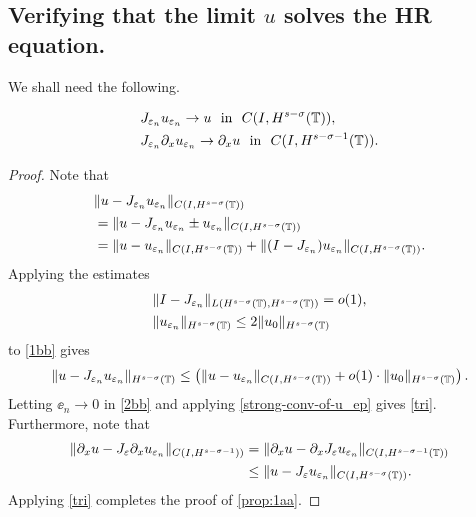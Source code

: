 \subsection{Verifying that the limit $u$ solves the HR equation.} 
We shall need the following. 
\begin{proposition}
\label{prop:1aa}
\begin{align}
    \label{tri}
& J_{\varepsilon_n} u_{\varepsilon_n} \to  u \ \ \text{in} \ \
C(I, H^{s-\sigma}(\mathbb{T})),
\\
\label{0dd}
& J_{\varepsilon_n} \partial_x u_{\varepsilon_n} \to  \partial_x u \ \
\text{in} \ \ C(I, H^{s-\sigma-1}(\mathbb{T})).
\end{align}
\end{proposition}
\begin{proof} Note that
\begin{equation}
\begin{split}
& \| u -  J_{\varepsilon_n} u_{\varepsilon_n}
\|_{C(I, H^{s-\sigma}(\mathbb{T}))}
\\
&= \| u -  J_{\varepsilon_n} u_{\varepsilon_n} \pm 
u_{\varepsilon_n} \|_{C(I, H^{s-\sigma}(\mathbb{T}))}
\\
& = \| u -  u_{\varepsilon_n}
\|_{C(I,H^{s-\sigma}(\mathbb{T}))} + \| (I - J_{\varepsilon_n})
u_{\varepsilon_n} \|_{C(I, H^{s-\sigma}(\mathbb{T}))}.
\label{1bb}
\end{split}
\end{equation}
Applying the estimates
\begin{equation*}
\begin{split}
& \|I-J_{\varepsilon_n} \|_{L(H^{s-\sigma}(\mathbb{T}), H^{s -
\sigma}(\mathbb{T}))} = o(1),
\\
& \|u_{\varepsilon_n}\|_{H^{s-\sigma}(\mathbb{T})} \le 2
\|u_0\|_{H^{s-\sigma}(\mathbb{T})}
\end{split}
\end{equation*}
to \eqref{1bb} gives
\begin{equation}
\label{2bb}
\begin{split}
\| u -  J_{\varepsilon_n} u_{\varepsilon_n}\|_{H^{s-\sigma}(\mathbb{T})}
\le \left( \| u -  u_{\varepsilon_n}
\|_{C(I, H^{s-\sigma}(\mathbb{T}))} + o(1) \cdot \|u_0
\|_{H^{s-\sigma}(\mathbb{T})} \right).
\end{split}
\end{equation}
Letting $\ee_n \to 0$ in \eqref{2bb} and applying
\eqref{strong-conv-of-u_ep} gives \eqref{tri}. Furthermore, note that
%
%
\begin{equation*}
\begin{split}
\|\partial_x u - J_\varepsilon \partial_x u_{\varepsilon_n} \|_{C(I,
H^{s-\sigma-1}))}  
& = \|\partial_x u - \partial_x J_\varepsilon u_{\varepsilon_n} \|_{C(I,
H^{s-\sigma-1}(\mathbb{T}))} 
\\
& \le \|u - J_\varepsilon u_{\varepsilon_n} \|_{C(I,
H^{s-\sigma}(\mathbb{T}))}.
\end{split}
\end{equation*}
Applying \eqref{tri} completes the proof of \cref{prop:1aa}. 
\end{proof}
